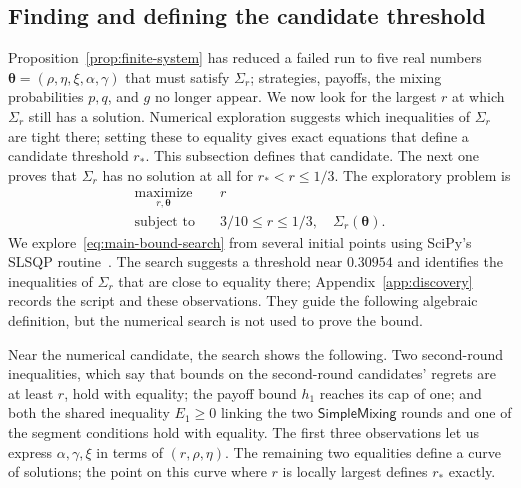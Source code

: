 \documentclass[11pt]{article}
\theoremstyle{remark}
\theoremstyle{plain}
\newcommand{\sm}{\mathsf{SimpleMixing}}
\begin{document}
\subsection{Finding and defining the candidate threshold}
\label{sec:bound-discovery}

Proposition~\ref{prop:finite-system} has reduced a failed run to
five real numbers $\boldsymbol\theta=(\rho,\eta,\xi,\alpha,\gamma)$
that must satisfy $\Sigma_r$; strategies, payoffs, the mixing
probabilities $p,q$, and $g$ no longer appear. We now look for the
largest $r$ at which $\Sigma_r$ still has a solution.
Numerical exploration suggests which inequalities of $\Sigma_r$ are
tight there; setting these to equality gives exact equations that
define a candidate threshold $r_*$. This
subsection defines that candidate. The next one proves that
$\Sigma_r$ has no solution at all for $r_*<r\le1/3$.
The exploratory problem is
\begin{equation}
 \begin{aligned}
 \operatorname*{maximize}_{r,\boldsymbol\theta}&\quad r\\
 \text{subject to}&\quad 3/10\le r\le1/3,\quad
                         \Sigma_r(\boldsymbol\theta).
 \end{aligned}
 \label{eq:main-bound-search}
\end{equation}
We explore~\eqref{eq:main-bound-search} from several initial points
using SciPy's SLSQP routine~\cite{scipy2020,kraft1988}. The search
suggests a threshold near $0.30954$ and identifies the inequalities
of $\Sigma_r$ that are close to equality there;
Appendix~\ref{app:discovery} records the script and
these observations. They guide the following algebraic definition,
but the numerical search is not used to prove the bound.

Near the numerical candidate, the search shows the following. Two
second-round inequalities, which say that bounds on the
second-round candidates' regrets are at least $r$, hold with
equality; the payoff bound $h_1$ reaches its cap of one; and both
the shared inequality $E_1\ge0$ linking the two $\sm$ rounds and one
of the segment conditions hold with equality. The first three observations
let us express $\alpha,\gamma,\xi$ in terms of $(r,\rho,\eta)$. The
remaining two equalities define a curve of solutions; the point on
this curve where $r$ is locally largest defines $r_*$ exactly.
\end{document}

